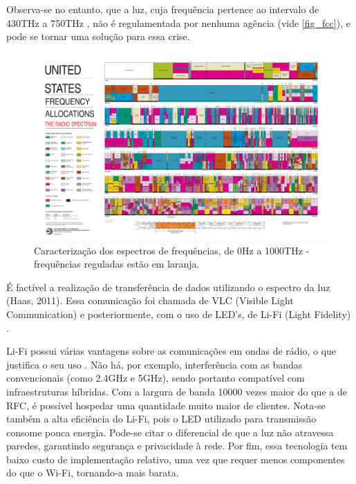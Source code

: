	Observa-se no entanto, que a luz, cuja frequência pertence ao intervalo de 430THz a 750THz \cite{vision},  não é regulamentada por nenhuma agência (vide \autoref{fig_fcc}), e pode se tornar uma solução para essa crise.

	\begin{figure}[h!]
		\caption{\label{fig_fcc}Caracterização dos espectros de frequências, de 0Hz a 1000THz - frequências reguladas estão em laranja.}
		\begin{center}
		\includegraphics[width=\textwidth, trim={36.5cm 3.1cm 40cm 61cm},clip]{2003-allochrt.pdf}	
		\end{center}
	\end{figure}
	
	 É factível a realização de transferência de dados utilizando o espectro da luz (Haas, 2011). Essa comunicação foi chamada de VLC (Visible Light Communication) e posteriormente, com o uso de LED's, de Li-Fi (Light Fidelity) \cite{what-is-lifi}. \par 
	
	Li-Fi possui várias vantagens sobre as comunicações em ondas de rádio, o que justifica o seu uso \cite{comparison-wifi}. Não há, por exemplo, interferência com as bandas convencionais (como 2.4GHz e 5GHz), sendo portanto compatível com infraestruturas híbridas. Com a largura de banda 10000 vezes maior do que a de RFC, é possível hospedar uma quantidade muito maior de clientes. Nota-se também a alta eficiência do Li-Fi, pois o LED utilizado para transmissão consome pouca energia. Pode-se citar o diferencial de que a luz não atravessa paredes, garantindo segurança e privacidade à rede. Por fim, essa tecnologia tem baixo custo de implementação relativo, uma vez que requer menos componentes do que o Wi-Fi, tornando-a mais barata. \par
	
